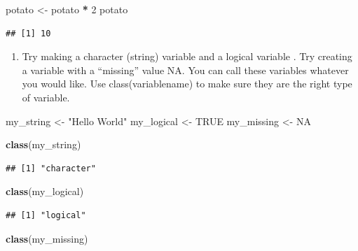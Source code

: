 \documentclass[
]{article}
\newenvironment{Shaded}{\begin{snugshade}}{\end{snugshade}}
\newcommand{\ConstantTok}[1]{\textcolor[rgb]{0.56,0.35,0.01}{#1}}
\newcommand{\DecValTok}[1]{\textcolor[rgb]{0.00,0.00,0.81}{#1}}
\newcommand{\FunctionTok}[1]{\textcolor[rgb]{0.13,0.29,0.53}{\textbf{#1}}}
\newcommand{\NormalTok}[1]{#1}
\newcommand{\OtherTok}[1]{\textcolor[rgb]{0.56,0.35,0.01}{#1}}
\newcommand{\SpecialCharTok}[1]{\textcolor[rgb]{0.81,0.36,0.00}{\textbf{#1}}}
\newcommand{\StringTok}[1]{\textcolor[rgb]{0.31,0.60,0.02}{#1}}
\providecommand{\tightlist}{%
  \setlength{\itemsep}{0pt}\setlength{\parskip}{0pt}}
\begin{document}
\begin{Shaded}
\begin{Highlighting}[]
\NormalTok{potato }\OtherTok{\textless{}{-}}\NormalTok{ potato }\SpecialCharTok{*} \DecValTok{2}
\NormalTok{potato}
\end{Highlighting}
\end{Shaded}

\begin{verbatim}
## [1] 10
\end{verbatim}

\begin{enumerate}
\def\labelenumi{\arabic{enumi}.}
\setcounter{enumi}{5}
\tightlist
\item
  Try making a character (string) variable and a logical variable . Try
  creating a variable with a ``missing'' value NA. You can call these
  variables whatever you would like. Use class(variablename) to make
  sure they are the right type of variable.
\end{enumerate}

\begin{Shaded}
\begin{Highlighting}[]
\NormalTok{my\_string }\OtherTok{\textless{}{-}} \StringTok{"Hello World"}
\NormalTok{my\_logical }\OtherTok{\textless{}{-}} \ConstantTok{TRUE}
\NormalTok{my\_missing }\OtherTok{\textless{}{-}} \ConstantTok{NA}

\FunctionTok{class}\NormalTok{(my\_string)}
\end{Highlighting}
\end{Shaded}

\begin{verbatim}
## [1] "character"
\end{verbatim}

\begin{Shaded}
\begin{Highlighting}[]
\FunctionTok{class}\NormalTok{(my\_logical)}
\end{Highlighting}
\end{Shaded}

\begin{verbatim}
## [1] "logical"
\end{verbatim}

\begin{Shaded}
\begin{Highlighting}[]
\FunctionTok{class}\NormalTok{(my\_missing)}
\end{Highlighting}
\end{Shaded}
\end{document}
